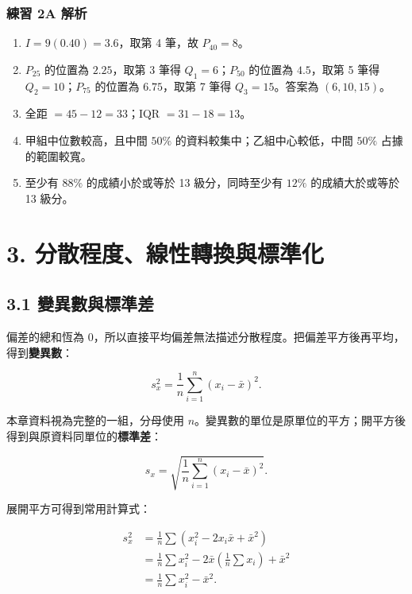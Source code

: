 \documentclass[11pt,a4paper]{article}
\providecommand{\tightlist}{%
  \setlength{\itemsep}{0pt}\setlength{\parskip}{0pt}}
\begin{document}
\subsubsection{練習 2A 解析}\label{ux7df4ux7fd2-2a-ux89e3ux6790}

\begin{enumerate}
\def\labelenumi{\arabic{enumi}.}
\tightlist
\item
  \(I=9(0.40)=3.6\)，取第 4 筆，故 \(\boxed{P_{40}=8}\)。
\item
  \(P_{25}\) 的位置為 \(2.25\)，取第 3 筆得 \(Q_1=6\)；\(P_{50}\) 的位置為 \(4.5\)，取第 5 筆得 \(Q_2=10\)；\(P_{75}\) 的位置為 \(6.75\)，取第 7 筆得 \(Q_3=15\)。答案為 \(\boxed{(6,10,15)}\)。
\item
  全距 \(=45-12=\boxed{33}\)；IQR \(=31-18=\boxed{13}\)。
\item
  甲組中位數較高，且中間 \(50\%\) 的資料較集中；乙組中心較低，中間 \(50\%\) 占據的範圍較寬。
\item
  至少有 \(88\%\) 的成績小於或等於 13 級分，同時至少有 \(12\%\) 的成績大於或等於 13 級分。
\end{enumerate}

\section{3. 分散程度、線性轉換與標準化}\label{ux5206ux6563ux7a0bux5ea6ux7ddaux6027ux8f49ux63dbux8207ux6a19ux6e96ux5316}

\subsection{3.1 變異數與標準差}\label{ux8b8aux7570ux6578ux8207ux6a19ux6e96ux5dee}

偏差的總和恆為 0，所以直接平均偏差無法描述分散程度。把偏差平方後再平均，得到\textbf{變異數}：

\[
\boxed{s_x^2=\frac1n\sum_{i=1}^{n}(x_i-\bar{x})^2}.
\]

本章資料視為完整的一組，分母使用 \(n\)。變異數的單位是原單位的平方；開平方後得到與原資料同單位的\textbf{標準差}：

\[
\boxed{s_x=\sqrt{\frac1n\sum_{i=1}^{n}(x_i-\bar{x})^2}}.
\]

展開平方可得到常用計算式：

\[
\begin{aligned}
s_x^2
&=\frac1n\sum(x_i^2-2x_i\bar{x}+\bar{x}^2)\\
&=\frac1n\sum x_i^2-2\bar{x}\left(\frac1n\sum x_i\right)+\bar{x}^2\\
&=\boxed{\frac1n\sum x_i^2-\bar{x}^2}.
\end{aligned}
\]
\end{document}
